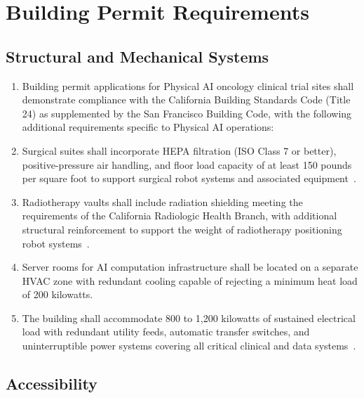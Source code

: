 \section{Building Permit Requirements}

\subsection{Structural and Mechanical Systems}

\begin{enumerate}[label=(\alph*)]
\item Building permit applications for Physical AI oncology clinical trial
  sites shall demonstrate compliance with the California Building Standards
  Code (Title 24) as supplemented by the San Francisco Building Code, with
  the following additional requirements specific to Physical AI operations:

\item Surgical suites shall incorporate HEPA filtration (ISO Class 7 or better),
  positive-pressure air handling, and floor load capacity of at least 150
  pounds per square foot to support surgical robot systems and associated
  equipment~\cite{sitespec2026}.

\item Radiotherapy vaults shall include radiation shielding meeting the
  requirements of the California Radiologic Health Branch, with additional
  structural reinforcement to support the weight of radiotherapy positioning
  robot systems~\cite{sitespec2026}.

\item Server rooms for AI computation infrastructure shall be located on a
  separate HVAC zone with redundant cooling capable of rejecting a minimum
  heat load of 200 kilowatts.

\item The building shall accommodate 800 to 1,200 kilowatts of sustained
  electrical load with redundant utility feeds, automatic transfer switches,
  and uninterruptible power systems covering all critical clinical and
  data systems~\cite{sitespec2026}.
\end{enumerate}

\subsection{Accessibility}

